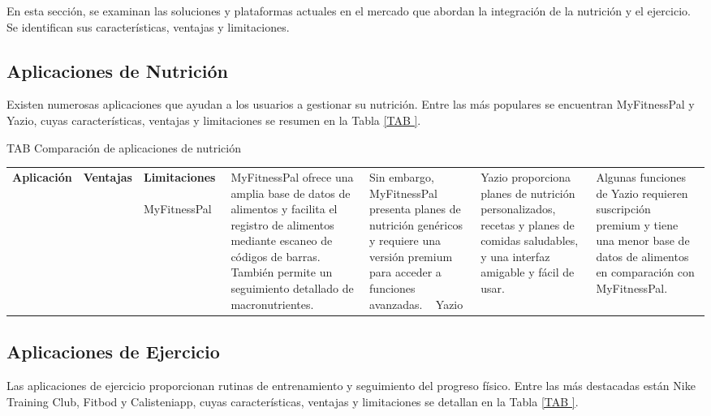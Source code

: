 En esta sección, se examinan las soluciones y plataformas actuales en el mercado que abordan la integración de la nutrición y el ejercicio. Se identifican sus características, ventajas y limitaciones.

\subsection{Aplicaciones de Nutrición}

Existen numerosas aplicaciones que ayudan a los usuarios a gestionar su nutrición. Entre las más populares se encuentran MyFitnessPal y Yazio, cuyas características, ventajas y limitaciones se resumen en la Tabla \ref{TAB
}.

\begin{table}[Comparación de aplicaciones de nutrición]{TAB
}{Comparación de aplicaciones de nutrición}
\begin{tabular}{|p{3cm}|p{5cm}|p{5cm}|}
\hline
\textbf{Aplicación} & \textbf{Ventajas} & \textbf{Limitaciones} \
\hline
MyFitnessPal & MyFitnessPal ofrece una amplia base de datos de alimentos y facilita el registro de alimentos mediante escaneo de códigos de barras. También permite un seguimiento detallado de macronutrientes. & Sin embargo, MyFitnessPal presenta planes de nutrición genéricos y requiere una versión premium para acceder a funciones avanzadas. \
\hline
Yazio & Yazio proporciona planes de nutrición personalizados, recetas y planes de comidas saludables, y una interfaz amigable y fácil de usar. & Algunas funciones de Yazio requieren suscripción premium y tiene una menor base de datos de alimentos en comparación con MyFitnessPal. \
\hline
\end{tabular}
\end{table}

\subsection{Aplicaciones de Ejercicio}

Las aplicaciones de ejercicio proporcionan rutinas de entrenamiento y seguimiento del progreso físico. Entre las más destacadas están Nike Training Club, Fitbod y Calisteniapp, cuyas características, ventajas y limitaciones se detallan en la Tabla \ref{TAB
}.

